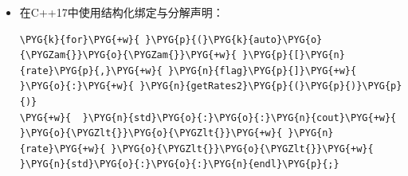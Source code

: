 \begin{itemize}
\begin{codeblockbg}
\begin{Verbatim}[commandchars=\\\{\},breaklines=true,breakanywhere=true,fontsize=\codefont,xleftmargin=17bp]
\PYG{k}{for}\PYG{+w}{ }\PYG{p}{(}\PYG{k}{auto}\PYG{o}{\PYGZam{}}\PYG{o}{\PYGZam{}}\PYG{+w}{ }\PYG{n}{rate}\PYG{+w}{ }\PYG{o}{:}\PYG{+w}{ }\PYG{n}{getRates}\PYG{p}{(}\PYG{p}{)}\PYG{p}{)}
\PYG{+w}{  }\PYG{n}{std}\PYG{o}{:}\PYG{o}{:}\PYG{n}{cout}\PYG{+w}{ }\PYG{o}{\PYGZlt{}}\PYG{o}{\PYGZlt{}}\PYG{+w}{ }\PYG{n}{rate}\PYG{+w}{ }\PYG{o}{\PYGZlt{}}\PYG{o}{\PYGZlt{}}\PYG{+w}{ }\PYG{n}{std}\PYG{o}{:}\PYG{o}{:}\PYG{n}{endl}\PYG{p}{;}
\PYG{k}{for}\PYG{+w}{ }\PYG{p}{(}\PYG{k}{auto}\PYG{+w}{ }\PYG{o}{\PYGZam{}}\PYG{+w}{ }\PYG{n}{rate}\PYG{+w}{ }\PYG{o}{:}\PYG{+w}{ }\PYG{n}{rates}\PYG{p}{)}
\PYG{+w}{  }\PYG{n}{rate}\PYG{+w}{ }\PYG{o}{*}\PYG{o}{=}\PYG{+w}{ }\PYG{l+m+mi}{2}\PYG{p}{;}
\PYG{k}{for}\PYG{+w}{ }\PYG{p}{(}\PYG{k}{auto}\PYG{+w}{ }\PYG{k}{const}\PYG{+w}{ }\PYG{o}{\PYGZam{}}\PYG{+w}{ }\PYG{n}{rate}\PYG{+w}{ }\PYG{o}{:}\PYG{+w}{ }\PYG{n}{rates}\PYG{p}{)}
\PYG{+w}{  }\PYG{n}{std}\PYG{o}{:}\PYG{o}{:}\PYG{n}{cout}\PYG{+w}{ }\PYG{o}{\PYGZlt{}}\PYG{o}{\PYGZlt{}}\PYG{+w}{ }\PYG{n}{rate}\PYG{+w}{ }\PYG{o}{\PYGZlt{}}\PYG{o}{\PYGZlt{}}\PYG{+w}{ }\PYG{n}{std}\PYG{o}{:}\PYG{o}{:}\PYG{n}{endl}\PYG{p}{;}
\end{Verbatim}
\end{codeblockbg}



\item 在C++17中使用结构化绑定与分解声明：



\begin{codeblockbg}
\begin{Verbatim}[commandchars=\\\{\},breaklines=true,breakanywhere=true,fontsize=\codefont,xleftmargin=17bp]
\PYG{k}{for}\PYG{+w}{ }\PYG{p}{(}\PYG{k}{auto}\PYG{o}{\PYGZam{}}\PYG{o}{\PYGZam{}}\PYG{+w}{ }\PYG{p}{[}\PYG{n}{rate}\PYG{p}{,}\PYG{+w}{ }\PYG{n}{flag}\PYG{p}{]}\PYG{+w}{ }\PYG{o}{:}\PYG{+w}{ }\PYG{n}{getRates2}\PYG{p}{(}\PYG{p}{)}\PYG{p}{)}
\PYG{+w}{  }\PYG{n}{std}\PYG{o}{:}\PYG{o}{:}\PYG{n}{cout}\PYG{+w}{ }\PYG{o}{\PYGZlt{}}\PYG{o}{\PYGZlt{}}\PYG{+w}{ }\PYG{n}{rate}\PYG{+w}{ }\PYG{o}{\PYGZlt{}}\PYG{o}{\PYGZlt{}}\PYG{+w}{ }\PYG{n}{std}\PYG{o}{:}\PYG{o}{:}\PYG{n}{endl}\PYG{p}{;}
\end{Verbatim}
\end{codeblockbg}

\end{itemize}


